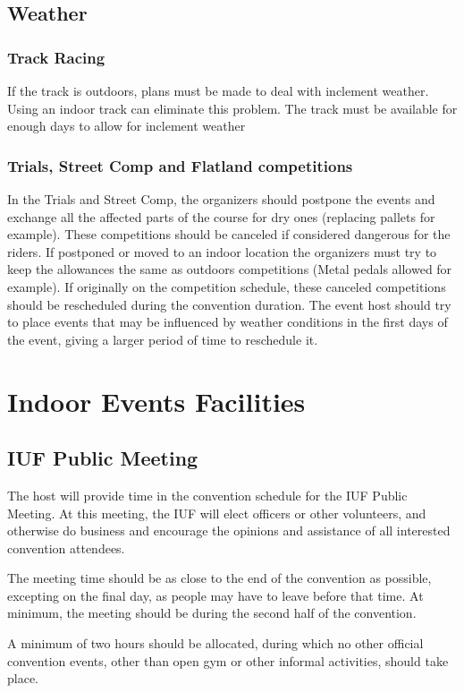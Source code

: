 \section{Weather}

\subsection{Track Racing}
If the track is outdoors, plans must be made to deal with inclement weather.
Using an indoor track can eliminate this problem.
The track must be available for enough days to allow for inclement weather 
\subsection{Trials, Street Comp and Flatland competitions}
In the Trials and Street Comp, the organizers should postpone the events and exchange all the affected parts of the course for dry ones (replacing pallets for example).
These competitions should be canceled if considered dangerous for the riders.
If postponed or moved to an indoor location the organizers must try to keep the allowances the same as outdoors competitions (Metal pedals allowed for example).
If originally on the competition schedule, these canceled competitions should be rescheduled during the convention duration.
The event host should try to place events that may be influenced by weather conditions in the first days of the event, giving a larger period of time to reschedule it.

\chapter{Indoor Events Facilities}
\section{IUF Public Meeting}
The host will provide time in the convention schedule for the IUF Public Meeting.
At this meeting, the IUF will elect officers or other volunteers, and otherwise do business and encourage the opinions and assistance of all interested convention attendees.

The meeting time should be as close to the end of the convention as possible, excepting on the final day, as people may have to leave before that time.
At minimum, the meeting should be during the second half of the convention.

A minimum of two hours should be allocated, during which no other official convention events, other than open gym or other informal activities, should take place.

